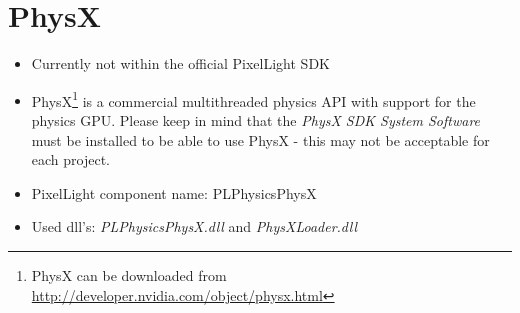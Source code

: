 \section{PhysX}
\begin{itemize}
\item Currently not within the official PixelLight SDK
\item PhysX\footnote{PhysX can be downloaded from \url{http://developer.nvidia.com/object/physx.html}} is a commercial multithreaded physics API with support for the physics GPU. Please keep in mind that the \emph{PhysX SDK System Software} must be installed to be able to use PhysX - this may not be acceptable for each project.
\item PixelLight component name: PLPhysicsPhysX
\item Used dll's: \emph{PLPhysicsPhysX.dll} and \emph{PhysXLoader.dll}
\end{itemize}
